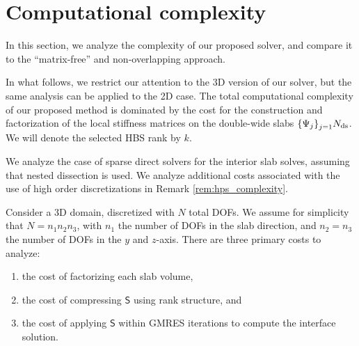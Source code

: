 \documentclass[final,onefignum,onetabnum]{siamart250211}
\newcommand{\mtx}[1]{\bm{\mathsf{#1}}}
\theoremstyle{definition}
\begin{document}

\section{Computational complexity}\label{sec:complexity}
In this section, we analyze the complexity of our proposed solver, and compare it to the ``matrix-free'' and non-overlapping approach.

In what follows, we restrict our attention to the 3D version of our solver, but the same analysis can be applied to the 2D case. The total computational complexity of our proposed method is dominated by the cost for the construction and factorization of the local stiffness matrices on the double-wide slabs $\{\Psi_j\}_{j=1}^{}N_{\rm ds}$. We will denote the selected HBS rank by $k$.

We analyze the case of sparse direct solvers for the interior slab solves, assuming that nested dissection is used. We analyze additional costs associated with the use of high order discretizations in Remark \ref{rem:hps_complexity}.

Consider a 3D domain, discretized with $N$ total DOFs. We assume for simplicity that $N = n_1n_2n_3$, with $n_1$ the number of DOFs in the slab direction, and $n_2=n_3$ the number of DOFs in the $y$ and $z$-axis. There are three primary costs to analyze:
\begin{enumerate}
    \item the cost of factorizing each slab volume,
    \item the cost of compressing $\mtx{S}$ using rank structure, and 
    \item the cost of applying $\mtx{S}$ within GMRES iterations to compute the interface solution. 
\end{enumerate}
\end{document}
